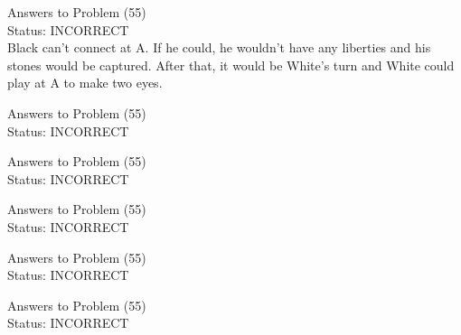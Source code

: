 \documentclass[11pt]{article}
\begin{document}
\begin{minipage}[t]{0.5\textwidth}
  {\centering
  
  Answers to Problem (55)\\
  Status: INCORRECT\\
  Black can't connect at A. If he could, he wouldn't have any liberties and his stones would be captured. After that, it would be White’s turn and White could play at A to make two eyes.\\
  }
\end{minipage}
\begin{minipage}[t]{0.5\textwidth}
  {\centering
  
  Answers to Problem (55)\\
  Status: INCORRECT\\
  
  }
\end{minipage}
\begin{minipage}[t]{0.5\textwidth}
  {\centering
  
  Answers to Problem (55)\\
  Status: INCORRECT\\
  
  }
\end{minipage}
\begin{minipage}[t]{0.5\textwidth}
  {\centering
  
  Answers to Problem (55)\\
  Status: INCORRECT\\
  
  }
\end{minipage}
\begin{minipage}[t]{0.5\textwidth}
  {\centering
  
  Answers to Problem (55)\\
  Status: INCORRECT\\
  
  }
\end{minipage}
\begin{minipage}[t]{0.5\textwidth}
  {\centering
  
  Answers to Problem (55)\\
  Status: INCORRECT\\
  
  }
\end{minipage}
\end{document}
